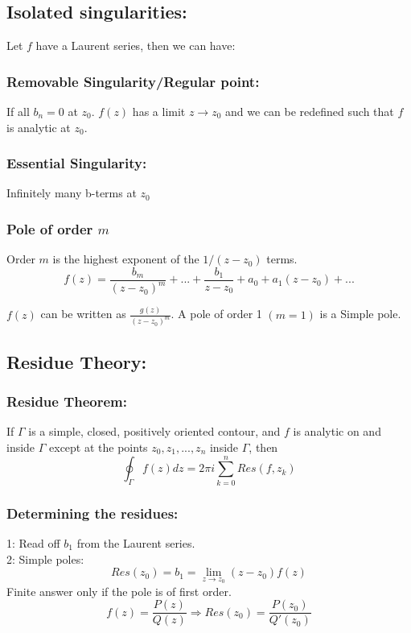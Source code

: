 \documentclass[a4paper,norsk, 10pt]{article}
\begin{document}
\subsection{Isolated singularities:}
Let $f$ have a Laurent series, then we can have:
\subsubsection{Removable Singularity/Regular point:}
If all $b_n = 0$ at $z_0$. $f(z)$ has a limit $z\rightarrow z_0$ and we can be redefined such that $f$ is analytic at $z_0$.
\subsubsection{Essential Singularity:}
Infinitely many b-terms at $z_0$
\subsubsection{Pole of order $m$}
Order $m$ is the highest exponent of the $1/(z-z_0)$ terms.
\begin{equation}
f(z) = \frac{b_m}{(z-z_0)^m}+ ... + \frac{b_1}{z-z_0} + a_0 + a_1(z-z_0) +...
\end{equation}

 $f(z)$ can be written as $\frac{g(z)}{(z-z_0)^m}$. A pole of order 1 $(m = 1)$ is a Simple pole.
 
\subsection{Residue Theory:}
\subsubsection{Residue Theorem:}
If $\Gamma$ is a simple, closed, positively oriented contour, and $f$ is analytic on and inside $\Gamma$ except at the points $z_0,z_1,...,z_n$ inside $\Gamma$, then
\begin{equation}
\oint_{\Gamma}f(z)dz = 2\pi i \sum_{k=0}^n Res(f,z_k)
\end{equation}

\subsubsection{Determining the residues:}
1: Read off $b_1$ from the Laurent series.\\

2: Simple poles:
\begin{equation}
Res(z_0) = b_1 = \lim_{z\rightarrow z_0}(z-z_0)f(z)
\end{equation}
Finite answer only if the pole is of first order. 
\begin{equation}
f(z) = \frac{P(z)}{Q(z)} \Rightarrow Res(z_0) = \frac{P(z_0)}{Q'(z_0)}
\end{equation}
\end{document}
